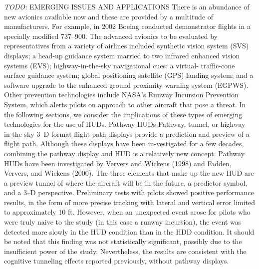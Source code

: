 \documentclass[utf8,bachelor,manualbib]{gradu3}
\begin{document}
\emph{TODO:}
EMERGING ISSUES AND APPLICATIONS
There is an abundance of new avionics available now and these are provided by
a multitude of manufacturers. For example, in 2002 Boeing conducted demonstrator
flights in a specially modified 737–900. The advanced avionics to be
evaluated by representatives from a variety of airlines included synthetic vision
system (SVS) displays; a head-up guidance system married to two infrared enhanced
vision systems (EVS); highway-in-the-sky navigational cues; a virtual-
traffic-cone surface guidance system; global positioning satellite (GPS)
landing system; and a software upgrade to the enhanced ground proximity warning
system (EGPWS). Other prevention technologies include NASA’s Runway
Incursion Prevention System, which alerts pilots on approach to other aircraft
that pose a threat. In the following sections, we consider the implications of
these types of emerging technologies for the use of HUDs.
Pathway HUDs
Pathway, tunnel, or highway-in-the-sky 3–D format flight path displays provide
a prediction and preview of a flight path. Although these displays have been in-vestigated for a few decades, combining the pathway display and HUD is a relatively
new concept.
Pathway HUDs have been investigated by Ververs and Wickens (1998) and
Fadden, Ververs, and Wickens (2000). The three elements that make up the new
HUD are a preview tunnel of where the aircraft will be in the future, a predictor
symbol, and a 3–D perspective. Preliminary tests with pilots showed positive performance
results, in the form of more precise tracking with lateral and vertical error
limited to approximately 10 ft. However, when an unexpected event arose for
pilots who were truly naive to the study (in this case a runway incursion), the event
was detected more slowly in the HUD condition than in the HDD condition. It
should be noted that this finding was not statistically significant, possibly due to
the insufficient power of the study. Nevertheless, the results are consistent with the
cognitive tunneling effects reported previously, without pathway displays. \citep{crawfordneal2006}
\end{document}
